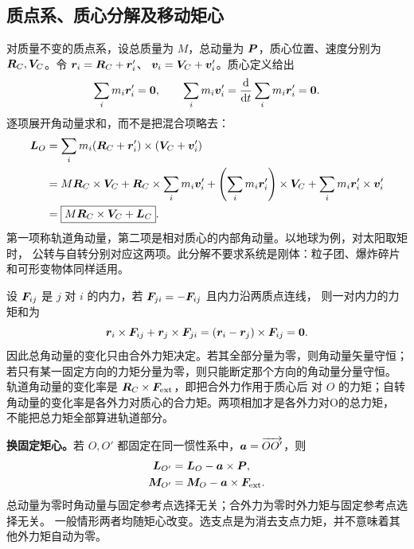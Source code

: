 {\subsection{质点系、质心分解及移动矩心}
对质量不变的质点系，设总质量为 $M$，总动量为 $\bm{P}$，质心位置、速度分别为
$\bm{R}_C,\bm{V}_C$。令 $\bm{r}_i=\bm{R}_C+\bm{r}_i'$、
$\bm{v}_i=\bm{V}_C+\bm{v}_i'$。质心定义给出
\begin{equation}
 \sum_i m_i\bm{r}_i'=\bm{0},\qquad
 \sum_i m_i\bm{v}_i'=\frac{\mathop{}\!\mathrm d}{\mathop{}\!\mathrm d t}\sum_i m_i\bm{r}_i'=\bm{0}.
\end{equation}
逐项展开角动量求和，而不是把混合项略去：
\begin{align}
 \bm{L}_O&=\sum_i m_i(\bm{R}_C+\bm{r}_i')\times(\bm{V}_C+\bm{v}_i')\\
 &=M\bm{R}_C\times\bm{V}_C
 +\bm{R}_C\times\sum_i m_i\bm{v}_i'
 +\left(\sum_i m_i\bm{r}_i'\right)\times\bm{V}_C
 +\sum_i m_i\bm{r}_i'\times\bm{v}_i'\\
 &=\boxed{M\bm{R}_C\times\bm{V}_C+\bm{L}_C}.
\end{align}
第一项称轨道角动量，第二项是相对质心的内部角动量。以地球为例，对太阳取矩时，
公转与自转分别对应这两项。此分解不要求系统是刚体：粒子团、爆炸碎片和可形变物体同样适用。

设 $\bm{F}_{ij}$ 是 $j$ 对 $i$ 的内力，若 $\bm{F}_{ji}=-\bm{F}_{ij}$ 且内力沿两质点连线，
则一对内力的力矩和为
\begin{equation}
 \bm{r}_i\times\bm{F}_{ij}+\bm{r}_j\times\bm{F}_{ji}
 =(\bm{r}_i-\bm{r}_j)\times\bm{F}_{ij}=\bm{0}.
\end{equation}
因此总角动量的变化只由合外力矩决定。若其全部分量为零，则角动量矢量守恒；
若只有某一固定方向的力矩分量为零，则只能断定那个方向的角动量分量守恒。
轨道角动量的变化率是 $\bm{R}_C\times\bm{F}_{\rm ext}$，即把合外力作用于质心后
对 $O$ 的力矩；自转角动量的变化率是各外力对质心的合力矩。两项相加才是各外力对O的总力矩，
不能把总力矩全部算进轨道部分。

\textbf{换固定矩心。}若 $O,O'$ 都固定在同一惯性系中，$\bm{a}=\overrightarrow{OO'}$，则
\begin{align}
 \bm{L}_{O'}&=\bm{L}_O-\bm{a}\times\bm{P},\\
 \bm{M}_{O'}&=\bm{M}_O-\bm{a}\times\bm{F}_{\rm ext}.
\end{align}
总动量为零时角动量与固定参考点选择无关；合外力为零时外力矩与固定参考点选择无关。
一般情形两者均随矩心改变。选支点是为消去支点力矩，并不意味着其他外力矩自动为零。

}
